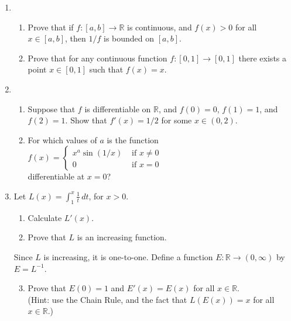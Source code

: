 \documentclass[12pt]{article}
\newcommand{\points}[1]{\marginpar{\hspace{24pt}[#1]}}
\newcommand{\R}{\mathbb{R}}
\begin{document}
\begin{enumerate}
\item \begin{enumerate}
       \item Prove that if $f:[a,b]\to\R$ is continuous, and $f(x)>0$ for all $x\in [a,b]$, then $1/f$ is bounded on $[a,b]$. \points{5}

\vspace{4in}


       \item Prove that for any continuous function $f:[0,1]\to[0,1]$ there exists a point $x\in [0,1]$ such that $f(x)=x$. \points{5}



      \end{enumerate}
\newpage
\item \begin{enumerate}
       \item Suppose that $f$ is differentiable on $\R$, and $f(0)=0$, $f(1)=1$, and $f(2)=1$. \points{5} Show that $f'(x) = 1/2$ for some $x\in (0,2)$.

\vspace{3.5in}

       \item For which values of $a$ is the function $f(x) = \begin{cases} x^a\sin(1/x) &\text{ if } x\neq 0\\ 0 &\text{ if } x=0\end{cases}$\\ differentiable at $x=0$?\points{5}

      \end{enumerate}
\newpage


\newpage

 \item Let $\displaystyle L(x) = \int_1^x \frac{1}{t}\,dt$, for $x>0$.
\begin{enumerate}
 \item Calculate $L'(x)$. \points{2}

\vspace{1.5in}

 \item Prove that $L$ is an increasing function. \points{3}

\vspace{2in}

\end{enumerate}

 Since $L$ is increasing, it is one-to-one. Define a function $E:\R\to(0,\infty)$ by $E = L^{-1}$.
\begin{enumerate}
\setcounter{enumii}{2}
\item Prove that $E(0)=1$ and $E'(x) = E(x)$ for all $x\in\R$. \points{5}\\
(Hint: use the Chain Rule, and the fact that $L(E(x))=x$ for all $x\in\R$.)


\end{enumerate}
\end{enumerate}
\end{document}
